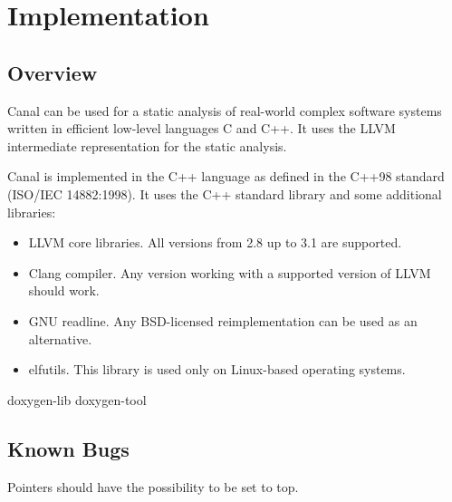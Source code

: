 \documentclass[a4paper]{book}
\begin{document}
\part{Implementation}

\chapter{Overview}

Canal can be used for a static analysis of real-world complex software
systems written in efficient low-level languages C and C++.  It uses
the LLVM intermediate representation for the static analysis.

Canal is implemented in the C++ language as defined in the C++98
standard (ISO/IEC 14882:1998).  It uses the C++ standard library and
some additional libraries:
\begin{itemize}
\item LLVM core libraries.  All versions from 2.8 up to 3.1 are
  supported.
\item Clang compiler.  Any version working with a supported version of
  LLVM should work.
\item GNU readline.  Any BSD-licensed reimplementation can be used as
  an alternative.
\item elfutils.  This library is used only on Linux-based operating
  systems.
\end{itemize}

{doxygen-lib}
{doxygen-tool}

\chapter{Known Bugs}
Pointers should have the possibility to be set to top.
\end{document}
